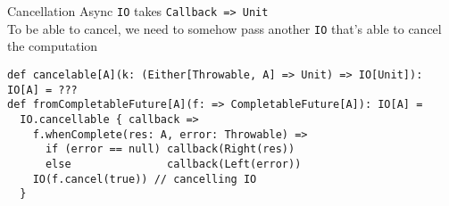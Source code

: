 \documentclass[aspectratio=169]{beamer}
\begin{document}
\begin{frame}[fragile]{Cancellation}
Async \texttt{IO} takes \texttt{Callback => Unit}\\
To be able to cancel, we need to somehow pass another \texttt{IO} that's able to cancel the computation
\bigskip
\begin{verbatim}
def cancelable[A](k: (Either[Throwable, A] => Unit) => IO[Unit]): IO[A] = ???
def fromCompletableFuture[A](f: => CompletableFuture[A]): IO[A] =
  IO.cancellable { callback =>
    f.whenComplete(res: A, error: Throwable) =>
      if (error == null) callback(Right(res))
      else               callback(Left(error))
    IO(f.cancel(true)) // cancelling IO
  }
\end{verbatim}
\end{frame}

\end{document}
